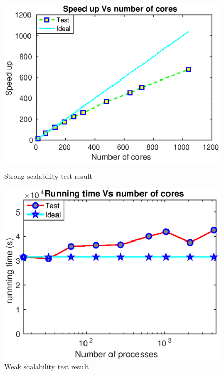 \documentclass[gmd, manuscript]{copernicus}
\begin{document}
\begin{figure}[!htb]
    \centering
    \begin{minipage}{.425\textwidth}
		\centering
		\includegraphics[scale=0.45]{Fig3}
		\caption{Strong scalability test result}
		\label{fig:strong_scale}
    \end{minipage}%
    \begin{minipage}{.425 \textwidth}
		\centering
		\includegraphics[scale=0.45]{Fig4}
		\caption{Weak scalability test result}
		\label{fig:weak_scale}
    \end{minipage}%
\end{figure}
\end{document}
